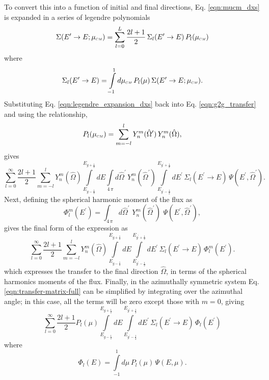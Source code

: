 \documentclass[../main.tex]{subfiles}
\begin{document}
To convert this into a function of initial and final directions, Eq. \eqref{eqn:mucm_dxs} is expanded in a series of legendre polynomials
\begin{equation} \label{eqn:legendre_expansion_dxs}
  \Sigma(E^{\prime}\rightarrow E; \mucm) = \sum_{l=0}^L \dfrac{2l+1}{2} \, \Sigma_l(E^{\prime}\rightarrow E) \, P_l(\mucm)
\end{equation}
where
\begin{equation}
  \Sigma_l(E^{\prime}\rightarrow E) = \int\limits_{-1}^{1} d\mucm \, P_l(\mu) \, \Sigma(E^{\prime}\rightarrow E; \mucm).
\end{equation}
Substituting Eq. \eqref{eqn:legendre_expansion_dxs} back into Eq. \eqref{eqn:g2g_transfer} and using the relationship,
\begin{equation}
  P_l(\mucm) = \sum\limits_{m=-l}^l Y_{n}^{m}(\hat{\Omega}^{\prime}) \, Y_{n}^{m}(\hat{\Omega}),
\end{equation}
gives
\begin{equation}
  \sum_{l=0}^{\infty} \dfrac{2l+1}{2} \sum\limits_{m=-l}^l Y_{n}^{m}(\hat{\Omega}) \int\limits_{E_{g-\frac{1}{2}}}^{E_{g+\frac{1}{2}}} dE \int\limits_{4 \, \pi} d\hat{\Omega}^{\prime} \, Y_{n}^{m}(\hat{\Omega}^{\prime}) \int\limits_{E_{g^{\prime}-\frac{1}{2}}}^{E_{g^{\prime}+\frac{1}{2}}} dE^{\prime} \, \Sigma_l(E^{\prime}\rightarrow E) \, \Psi(E^{\prime},\hat{\Omega}^{\prime}).
\end{equation}
Next, defining the spherical harmonic moment of the flux as
\begin{equation}
  \Phi_l^m(E^{\prime}) = \int_{4\,\pi} d\hat{\Omega}^{\prime} \,\, Y_{n}^{m}(\hat{\Omega}^{\prime}) \,\, \Psi(E^{\prime},\hat{\Omega}^{\prime}),
\end{equation}
gives the final form of the expression as
\begin{equation} \label{eqn:transfer-matrix-full}
  \sum_{l=0}^{\infty} \dfrac{2l+1}{2} \sum\limits_{m=-l}^l Y_{n}^{m}(\hat{\Omega}) \int\limits_{E_{g-\frac{1}{2}}}^{E_{g+\frac{1}{2}}} dE \int\limits_{E_{g^{\prime}-\frac{1}{2}}}^{E_{g^{\prime}+\frac{1}{2}}} dE^{\prime} \, \Sigma_l(E^{\prime}\rightarrow E) \, \Phi_l^m(E^{\prime}).
\end{equation}
which expresses the transfer to the final direction $\hat{\Omega}$, in terms of the spherical harmonics moments of the flux. Finally, in the azimuthally symmetric system Eq. \eqref{eqn:transfer-matrix-full} can be simplified by integrating over the azimuthal angle; in this case, all the terms will be zero except those with $m = 0$, giving
\begin{equation} \label{eqn:transfer-matrix-simple}
  \sum_{l=0}^{\infty} \dfrac{2l+1}{2}  P_{l}(\mu) \int\limits_{E_{g-\frac{1}{2}}}^{E_{g+\frac{1}{2}}} dE \int\limits_{E_{g^{\prime}-\frac{1}{2}}}^{E_{g^{\prime}+\frac{1}{2}}} dE^{\prime} \, \Sigma_l(E^{\prime}\rightarrow E) \, \Phi_l(E^{\prime})
\end{equation}
where
\begin{equation}
  \Phi_l(E) = \int\limits_{-1}^{1} d\mu \, P_l(\mu) \, \Psi(E,\mu).
\end{equation}
\end{document}
